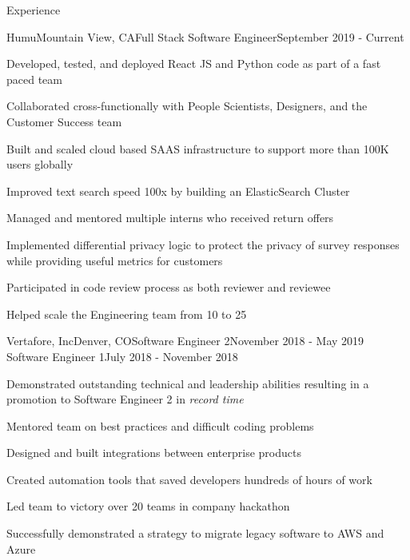\documentclass{resume} %
\begin{document}

\begin{rSection}{Experience}

\begin{rSubsection}{Humu}{Mountain View, CA}{Full Stack Software Engineer}{September 2019 - Current}
\item Developed, tested, and deployed React JS and Python code as part of a fast paced team
\item Collaborated cross-functionally with People Scientists, Designers, and the Customer Success team
\item Built and scaled cloud based SAAS infrastructure to support more than 100K users globally
\item Improved text search speed 100x by building an ElasticSearch Cluster
\item Managed and mentored multiple interns who received return offers
\item Implemented differential privacy logic to protect the privacy of survey responses while providing useful metrics for customers
\item Participated in code review process as both reviewer and reviewee 
\item Helped scale the Engineering team from 10 to 25
\end{rSubsection}

\begin{rSubsection2}{Vertafore, Inc}{Denver, CO}{Software Engineer 2}{November 2018 - May 2019 }{Software Engineer 1}{July 2018 - November 2018}
\item Demonstrated outstanding technical and leadership abilities resulting in a promotion to Software Engineer 2 in \textit{record time}
\item Mentored team on best practices and difficult coding problems
\item Designed and built integrations between enterprise products
\item Created automation tools that saved developers hundreds of hours of work
\item Led team to victory over 20 teams in company hackathon
\item Successfully demonstrated a strategy to migrate legacy software to AWS and Azure
\end{rSubsection2}


\end{rSection}
\end{document}
